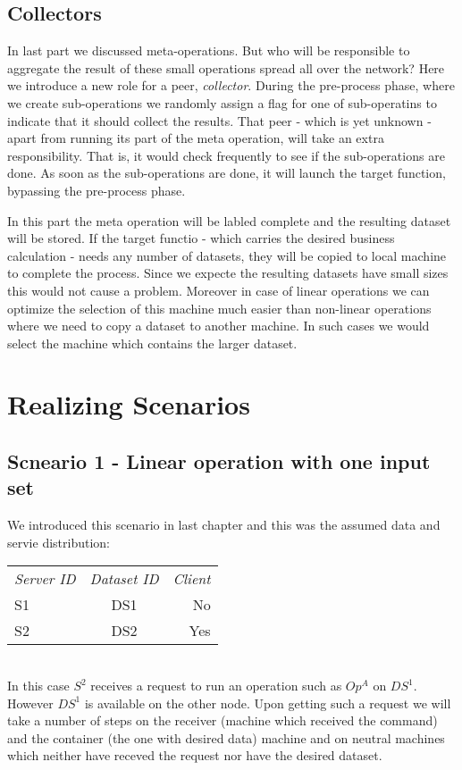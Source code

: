 \subsection{Collectors}
In last part we discussed meta-operations. 
But who will be responsible to aggregate the result of these small operations spread all over the network? 
Here we introduce a new role for a peer, \textit{collector}. 
During the pre-process phase, where we create sub-operations we randomly assign
a flag for one of sub-operatins to indicate that it should collect the results. 
That peer - which is yet unknown - apart from running its part of the meta operation,
will take an extra responsibility. That is, it would check frequently to see if the
sub-operations are done. As soon as the sub-operations are done, it will
launch the target function, bypassing the pre-process phase.

In this part the meta operation will be labled complete and the resulting dataset will be stored.
If the target functio - which carries the desired business calculation - needs any number of datasets,
they will be copied to local machine to complete the process. 
Since we expecte the resulting datasets have small sizes this would not cause a problem. 
Moreover in case of linear operations we can optimize the selection of this machine much easier than
non-linear operations where we need to copy a dataset to another machine. 
In such cases we would select the machine which contains the larger dataset.


\section{Realizing Scenarios}
\subsection{Scneario 1 - Linear operation with one input set}
We introduced this scenario in last chapter and this was the assumed data and servie distribution:

\begin{tabular}{ l c r }
\em{Server ID} & \em{ Dataset ID} & \em{ Client} \\
S1 & DS1 & No \\
S2 & DS2 & Yes \\
\end{tabular}\\

In this case \(S^2\) receives a request to run an operation such as \(Op^A\) on \(DS^1\).
However \(DS^1\) is available on the other node.
Upon getting such a request we will take a number of steps on the receiver (machine which received the command)
and the container (the one with desired data) machine and on neutral machines which neither have receved the
request nor have the desired dataset.

